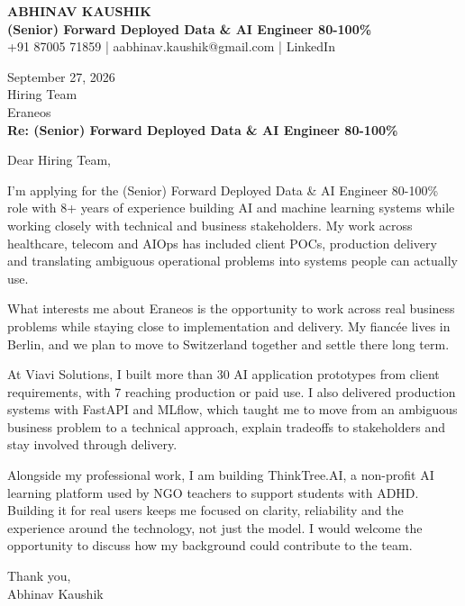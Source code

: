 \documentclass[10pt,a4paper]{article}
\begin{document}
\begin{center}
{\Large\bfseries ABHINAV KAUSHIK}\\[2pt]
{\bfseries (Senior) Forward Deployed Data \& AI Engineer 80-100\%}\\[2pt]
+91 87005 71859 \quad | \quad aabhinav.kaushik@gmail.com \quad | \quad LinkedIn
\end{center}
\vspace{8pt}
September 27, 2026\\[6pt]
Hiring Team\\
Eraneos\\[4pt]
\textbf{Re: (Senior) Forward Deployed Data \& AI Engineer 80-100\%}

Dear Hiring Team,

I’m applying for the (Senior) Forward Deployed Data \& AI Engineer 80-100\% role with 8+ years of experience building AI and machine learning systems while working closely with technical and business stakeholders. My work across healthcare, telecom and AIOps has included client POCs, production delivery and translating ambiguous operational problems into systems people can actually use.

What interests me about Eraneos is the opportunity to work across real business problems while staying close to implementation and delivery. My fiancée lives in Berlin, and we plan to move to Switzerland together and settle there long term.

At Viavi Solutions, I built more than 30 AI application prototypes from client requirements, with 7 reaching production or paid use. I also delivered production systems with FastAPI and MLflow, which taught me to move from an ambiguous business problem to a technical approach, explain tradeoffs to stakeholders and stay involved through delivery.

Alongside my professional work, I am building ThinkTree.AI, a non-profit AI learning platform used by NGO teachers to support students with ADHD. Building it for real users keeps me focused on clarity, reliability and the experience around the technology, not just the model. I would welcome the opportunity to discuss how my background could contribute to the team.

Thank you,\\
Abhinav Kaushik
\end{document}
